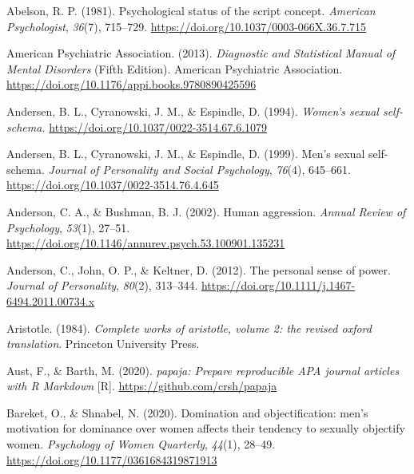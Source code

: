 \documentclass[
  donotrepeattitle,doc, 12pt, a4paper,floatsintext]{apa7}
\newlength{\cslhangindent}
\newlength{\cslentryspacingunit} %
\newenvironment{CSLReferences}[2] %
 {%
  \setlength{\parindent}{0pt}
  \ifodd #1
  \let\oldpar\par
  \def\par{\hangindent=\cslhangindent\oldpar}
  \fi
  \setlength{\parskip}{#2\cslentryspacingunit}
 }%
 {}
\begin{document}
\hypertarget{refs}{}
\begin{CSLReferences}{1}{0}
\leavevmode{}%
Abelson, R. P. (1981). Psychological status of the script concept. \emph{American Psychologist}, \emph{36}(7), 715--729. \url{https://doi.org/10.1037/0003-066X.36.7.715}

\leavevmode{}%
American Psychiatric Association. (2013). \emph{Diagnostic and Statistical Manual of Mental Disorders} (Fifth Edition). American Psychiatric Association. \url{https://doi.org/10.1176/appi.books.9780890425596}

\leavevmode{}%
Andersen, B. L., Cyranowski, J. M., \& Espindle, D. (1994). \emph{Women's sexual self-schema.} \url{https://doi.org/10.1037/0022-3514.67.6.1079}

\leavevmode{}%
Andersen, B. L., Cyranowski, J. M., \& Espindle, D. (1999). Men's sexual self-schema. \emph{Journal of Personality and Social Psychology}, \emph{76}(4), 645--661. \url{https://doi.org/10.1037/0022-3514.76.4.645}

\leavevmode{}%
Anderson, C. A., \& Bushman, B. J. (2002). Human aggression. \emph{Annual Review of Psychology}, \emph{53}(1), 27--51. \url{https://doi.org/10.1146/annurev.psych.53.100901.135231}

\leavevmode{}%
Anderson, C., John, O. P., \& Keltner, D. (2012). The personal sense of power. \emph{Journal of Personality}, \emph{80}(2), 313--344. \url{https://doi.org/10.1111/j.1467-6494.2011.00734.x}

\leavevmode{}%
Aristotle. (1984). \emph{Complete works of aristotle, volume 2: the revised oxford translation}. Princeton University Press.

\leavevmode{}%
Aust, F., \& Barth, M. (2020). \emph{papaja: Prepare reproducible APA journal articles with R Markdown} {[}R{]}. \url{https://github.com/crsh/papaja}

\leavevmode{}%
Bareket, O., \& Shnabel, N. (2020). Domination and objectification: men's motivation for dominance over women affects their tendency to sexually objectify women. \emph{Psychology of Women Quarterly}, \emph{44}(1), 28--49. \url{https://doi.org/10.1177/0361684319871913}


\end{CSLReferences}
\end{document}
